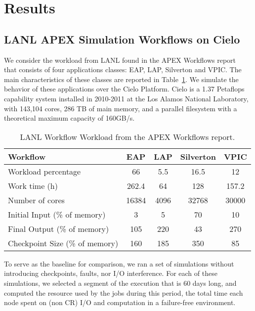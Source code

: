 
\section{Results}\label{sec:results}

\subsection{LANL APEX Simulation Workflows on Cielo}

We consider the workload from LANL found in the APEX Workflows
report~\cite{apex2016} that consists of four applications
classes: EAP, LAP, Silverton and VPIC. The main characteristics of
these classes are reported in Table~\ref{table:lanl}. We simulate the
behavior of these applications over the Cielo Platform. Cielo is a
1.37 Petaflops capability system installed in 2010-2011 at the Los
Alamos National Laboratory, with 143,104 cores, 286 TB of main memory,
and a parallel filesystem with a theoretical maximum capacity of 160GB/s.

\begin{table}
\begin{tabular}{|l|c|c|c|c|}
\hline
 Workflow & EAP & LAP & Silverton & VPIC \\\hline
Workload percentage & 66 & 5.5 & 16.5 & 12 \\\hline
Work time (h) & 262.4 & 64 & 128 & 157.2 \\\hline
Number of cores & 16384 & 4096 & 32768 & 30000 \\\hline
Initial Input (\% of memory) &  3 & 5 & 70 & 10 \\\hline
Final Output (\% of memory) & 105 & 220 & 43 & 270 \\\hline
Checkpoint Size (\% of memory) & 160 & 185 & 350 & 85 \\\hline
\end{tabular}
\caption{LANL Workflow Workload from the APEX Workflows report.\label{table:lanl}}
\end{table}

To serve as the baseline for comparison, we ran a set of simulations
without introducing checkpoints, faults, nor I/O interference. For
each of these simulations, we selected a segment of the execution that
is 60 days long, and computed the resource used by the jobs during
this period, \ie the total time each node spent on (non CR) I/O and
computation in a failure-free environment.

